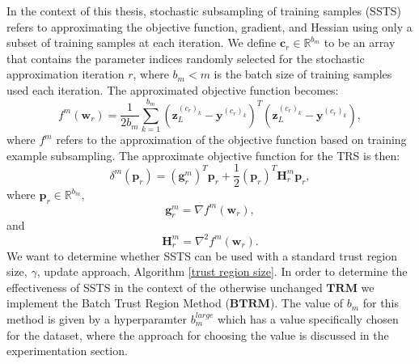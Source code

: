 \documentclass[letterpaper,12pt,titlepage,oneside,final]{book}
\begin{document}
	In the context of this thesis, stochastic subsampling of training samples (SSTS) refers to approximating the objective function, gradient, and Hessian using only a subset of training samples at each iteration. We define $\mathbf{c}_{r} \in \mathbb{R}^{b_{m}}$ to be an array that contains the parameter indices randomly selected for the stochastic approximation iteration $r$, where $b_{m} < m$ is the batch size of training samples used each iteration. The approximated objective function becomes:
	\begin{equation}
	f^{m}(\mathbf{w}_r) = \frac{1}{2b_{m}}\sum_{k=1}^{b_{m}}{(\mathbf{z}_{L}^{(c_{r})_{k}} - \mathbf{y}^{(c_{r})_{k}})^{T}(\mathbf{z}_{L}^{(c_{r})_{k}} - \mathbf{y}^{(c_{r})_{k}})},
	\end{equation}
	where $f^{m}$ refers to the approximation of the objective function based on training example subsampling. The approximate objective function for the TRS is then:
	\begin{equation}
	\delta^{m}(\mathbf{p}_{r}) = (\mathbf{g}_{r}^{m})^{T}\mathbf{p}_{r} + \frac{1}{2}(\mathbf{p}_{r})^{T}\mathbf{H}_{r}^{m}\mathbf{p}_{r},
	\end{equation}
	where $\mathbf{p}_{r} \in \mathbb{R}^{b_{m}}$, 
	\begin{equation}
	\mathbf{g}_{r}^{m} = \nabla f^{m}(\mathbf{w}_{r}),
	\end{equation}
	and
	\begin{equation}
	\mathbf{H}_{r}^{m} = \nabla^{2} f^{m}(\mathbf{w}_{r}).
	\end{equation}
	We want to determine whether SSTS can be used with a standard trust region size, $\gamma$, update approach, Algorithm \ref{trust region size}. In order to determine the effectiveness of SSTS in the context of the otherwise unchanged $\mathbf{TRM}$ we implement the Batch Trust Region Method ($\mathbf{BTRM}$). The value of $b_{m}$ for this method is given by a hyperparamter $b_{m}^{large}$ which has a value specifically chosen for the dataset, where the approach for choosing the value is discussed in the experimentation section.
	
\end{document}
